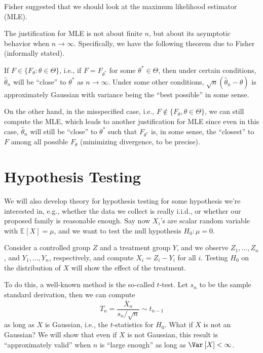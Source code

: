 \begin{eg}
	Fisher suggested that we should look at the maximum likelihood estimator (MLE).
\end{eg}

The justification for MLE is not about finite \(n\), but about its asymptotic behavior when \(n \to \infty \). Specifically, we have the following theorem due to Fisher (informally stated).

\begin{theorem}[Fisher]
	If \(F \in \{ F_\theta \colon \theta \in \Theta \} \), i.e., if \(F = F_{\theta ^{\ast} }\) for some \(\theta ^{\ast} \in \Theta \), then under certain conditions, \(\hat{\theta} _n\) will be ``close'' to \(\theta ^{\ast} \) as \(n \to \infty \). Under some other conditions, \(\sqrt{n}  (\hat{\theta} _n - \theta )\) is approximately Gaussian with variance being the ``best possible'' in some sense.
\end{theorem}

On the other hand, in the misspecified case, i.e., \(F \notin \{ F_{\theta } , \theta \in \Theta \} \), we can still compute the MLE, which leads to another justification for MLE since even in this case, \(\hat{\theta} _n\) will still be ``close'' to \(\theta ^{\ast} \) such that \(F_{\theta ^{\ast} }\) is, in some sense, the ``closest'' to \(F\) among all possible \(F_\theta \) (minimizing divergence, to be precise).

\section{Hypothesis Testing}
We will also develop theory for hypothesis testing for some hypothesis we're interested in, e.g., whether the data we collect is really i.i.d., or whether our proposed family is reasonable enough. Say now \(X_i\)'s are scalar random variable with \(\mathbb{E}_{}\left[X \right] = \mu \), and we want to test the null hypothesis \(H_0 \colon \mu = 0\).

\begin{eg}
	Consider a controlled group \(Z\) and a treatment group \(Y\), and we observe \(Z_1, \dots , Z_n\), and \(Y_1, \dots , Y_n\), respectively, and compute \(X_i = Z_i - Y_i\) for all \(i\). Testing \(H_0\) on the distribution of \(X\) will show the effect of the treatment.
\end{eg}

To do this, a well-known method is the so-called \(t\)-test. Let \(s_n\) to be the sample standard derivation, then we can compute
\[
	T_n = \frac{\overline{X} _n}{s_n / \sqrt{n} } \sim t_{n-1}
\]
as long as \(X\) is Gaussian, i.e., the \(t\)-statistics for \(H_0\). What if \(X\) is not an Gaussian? We will show that even if \(X\) is not Gaussian, this result is ``approximately valid'' when \(n\) is ``large enough'' as long as \(\Var_{}\left[X \right] < \infty \).

